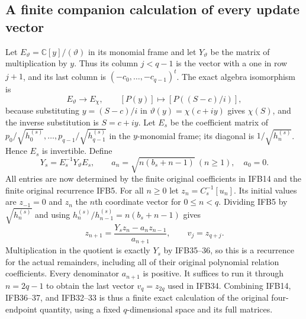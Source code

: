 \subsection{A finite companion calculation of every update vector}

Let $E_{\vartheta}=\mathbb C[y]/(\vartheta)$ in its monomial
frame and let $Y_\vartheta$ be the matrix of multiplication by $y$.
Thus its column $j<q-1$ is the vector with a one in row $j+1$,
and its last column is $(-c_0,\ldots,-c_{q-1})^t$.
The exact algebra isomorphism is
\[
 E_{\vartheta}\longrightarrow E_\chi,\qquad
 [P(y)]\longmapsto[P((S-c)/i)],
 \tag{IFB35}
\]
because substituting $y=(S-c)/i$ in
$\vartheta(y)=\chi(c+iy)$ gives $\chi(S)$, and the inverse
substitution is $S=c+iy$. Let $E_s$ be the coefficient matrix of
$p_0/\sqrt{h_0^{(s)}},\ldots,p_{q-1}/\sqrt{h_{q-1}^{(s)}}$
in the $y$-monomial frame; its diagonal is
$1/\sqrt{h_n^{(s)}}$. Hence $E_s$ is invertible. Define
\[
 Y_s=E_s^{-1}Y_\vartheta E_s,\qquad
 a_n=\sqrt{n(b_s+n-1)}\ (n\geq1),\quad a_0=0.
 \tag{IFB36}
\]
All entries are now determined by the finite original coefficients
in IFB14 and the finite original recurrence IFB5. For all $n\geq0$
let $z_n=C_s^{-1}[u_n]$. Its initial values are
$z_{-1}=0$ and $z_n$ the $n$th coordinate vector for $0\leq n<q$.
Dividing IFB5 by $\sqrt{h_n^{(s)}}$ and using
$h_n^{(s)}/h_{n-1}^{(s)}=n(b_s+n-1)$ gives
\[
 \boxed{\displaystyle
 z_{n+1}=\frac{Y_sz_n-a_nz_{n-1}}{a_{n+1}},\qquad
 v_j=z_{q+j}.}
 \tag{IFB37}
\]
Multiplication in the quotient is exactly $Y_s$ by IFB35--36, so
this is a recurrence for the actual remainders, including all of
their original polynomial relation coefficients. Every denominator
$a_{n+1}$ is positive. It suffices to run it through $n=2q-1$ to
obtain the last vector $v_q=z_{2q}$ used in IFB34. Combining
IFB14, IFB36--37, and IFB32--33 is thus a finite exact calculation
of the original four-endpoint quantity, using a fixed $q$-dimensional
space and its full matrices.

